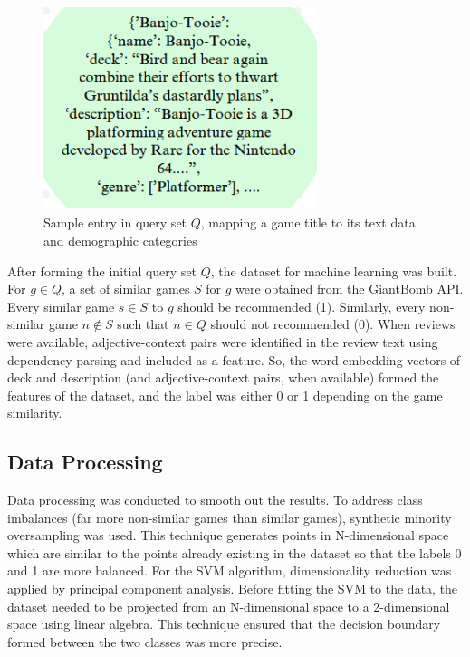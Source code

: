 \documentclass[10pt,twocolumn]{article}
\begin{document}
\begin{figure}[h!]
\includegraphics[width=8cm, height=6cm]{deck_desc_data_structure.PNG}
\centering
\caption{Sample entry in query set $Q$, mapping a game title to its text data and demographic categories}
\end{figure}

After forming the initial query set $Q$, the dataset for machine learning was built. For $g \in Q$, a set of similar games $S$ for $g$ were obtained from the GiantBomb API. Every similar game $s \in S$ to $g$ should be recommended (1). Similarly, every non-similar game $n \not\in S$ such that $n \in Q$ should not recommended (0). When reviews were available, adjective-context pairs were identified in the review text using dependency parsing and included as a feature. \cite{Meidl, LDiCaro} So, the word embedding vectors of deck and description (and adjective-context pairs, when available) formed the features of the dataset, and the label was either 0 or 1 depending on the game similarity.

\subsection{Data Processing}
Data processing was conducted to smooth out the results. To address class imbalances (far more non-similar games than similar games), synthetic minority oversampling was used. \cite{NVChawla} This technique generates points in N-dimensional space which are similar to the points already existing in the dataset so that the labels 0 and 1 are more balanced. For the SVM algorithm, dimensionality reduction was applied by principal component analysis. \cite{Joachims} Before fitting the SVM to the data, the dataset needed to be projected from an N-dimensional space to a 2-dimensional space using linear algebra. This technique ensured that the decision boundary formed between the two classes was more precise.
\end{document}
